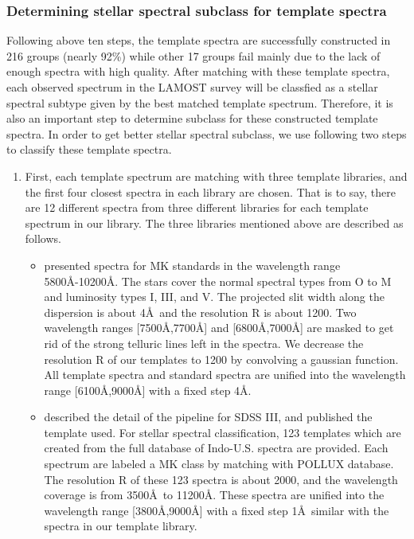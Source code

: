 \documentclass[manuscript]{aastex}
\begin{document}
\subsubsection{Determining stellar spectral subclass for template spectra}
Following  above ten steps, the template spectra are successfully constructed in 216 groups  (nearly 92\%) while
other 17 groups fail mainly due to the lack of enough spectra with high quality.
After matching with these template spectra, each observed spectrum in the LAMOST survey will be classfied as a stellar spectral subtype given by the best matched template spectrum.
Therefore, it is also an important step to determine  subclass for these constructed template spectra.
In order to get better stellar spectral subclass, we use following two steps to classify these template spectra.
\begin{enumerate}
\item First, each template spectrum are matching with three template libraries, and the first four closest spectra in each library are chosen.
That is to say, there are 12 different spectra from three different libraries for each template spectrum in our library.
The three libraries mentioned above are described as follows.
    \begin{itemize}
         \item \citet{danks1994atlas} presented spectra  for MK standards in the wavelength range    5800\AA-10200\AA.
        The stars cover the normal spectral types from O to M and    luminosity types I, III, and V.
        The projected slit width along the dispersion is about 4\AA\, and the resolution R is about 1200.
        Two wavelength ranges [7500\AA,7700\AA] and [6800\AA,7000\AA] are masked to get rid of the strong telluric lines left in the spectra.
        We decrease the resolution R of our templates to 1200 by convolving a gaussian function.
        All template spectra and standard spectra are unified into the wavelength range [6100\AA,9000\AA] with a fixed step 4\AA.

         \item \citet{bolton2012spectral} described the detail of the pipeline for SDSS III, and published the template used. %
        For stellar spectral classification,  123 templates which are created from the full database of Indo-U.S. spectra are provided.
        Each spectrum are labeled a MK class by matching with POLLUX database.
        The resolution R of these 123 spectra is about 2000, and the wavelength coverage is from 3500\AA\ to 11200\AA.
        These spectra are unified into the wavelength range [3800\AA,9000\AA] with a fixed step 1\AA\ similar with the spectra in our template library.


\end{itemize}
\end{enumerate}
\end{document}
